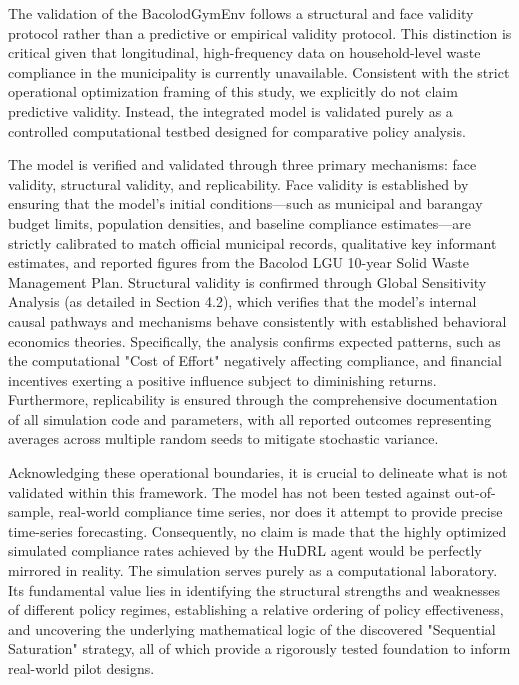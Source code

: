 The validation of the BacolodGymEnv follows a structural and face validity protocol rather than a predictive or empirical validity protocol. This distinction is critical given that longitudinal, high-frequency data on household-level waste compliance in the municipality is currently unavailable. Consistent with the strict operational optimization framing of this study, we explicitly do not claim predictive validity. Instead, the integrated model is validated purely as a controlled computational testbed designed for comparative policy analysis.

The model is verified and validated through three primary mechanisms: face validity, structural validity, and replicability. Face validity is established by ensuring that the model's initial conditions—such as municipal and barangay budget limits, population densities, and baseline compliance estimates—are strictly calibrated to match official municipal records, qualitative key informant estimates, and reported figures from the Bacolod LGU 10-year Solid Waste Management Plan. Structural validity is confirmed through Global Sensitivity Analysis (as detailed in Section 4.2), which verifies that the model's internal causal pathways and mechanisms behave consistently with established behavioral economics theories. Specifically, the analysis confirms expected patterns, such as the computational "Cost of Effort" negatively affecting compliance, and financial incentives exerting a positive influence subject to diminishing returns. Furthermore, replicability is ensured through the comprehensive documentation of all simulation code and parameters, with all reported outcomes representing averages across multiple random seeds to mitigate stochastic variance.

Acknowledging these operational boundaries, it is crucial to delineate what is not validated within this framework. The model has not been tested against out-of-sample, real-world compliance time series, nor does it attempt to provide precise time-series forecasting. Consequently, no claim is made that the highly optimized simulated compliance rates achieved by the HuDRL agent would be perfectly mirrored in reality. The simulation serves purely as a computational laboratory. Its fundamental value lies in identifying the structural strengths and weaknesses of different policy regimes, establishing a relative ordering of policy effectiveness, and uncovering the underlying mathematical logic of the discovered "Sequential Saturation" strategy, all of which provide a rigorously tested foundation to inform real-world pilot designs.
